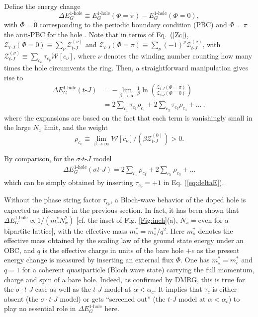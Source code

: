 \documentclass[aps,prb,twocolumn,notitlepage,superscriptaddress,showpacs]{revtex4-1}
\begin{document}
Define the energy change
\begin{equation}
\Delta E_{G}^{\text{1-hole}} \equiv E_{G}^{\text{1-hole}} (\Phi=\pi) - E_{G}^{\text{1-hole}} (\Phi=0),
\end{equation}
with $\Phi=0$ corresponding to the periodic boundary condition (PBC) and $\Phi=\pi$ the anit-PBC for the hole \cite{ZZ2013,ZZ2014qp}.  Note that  in terms of Eq.~(\ref{Zc}),
$\mathcal{Z}_{t\text{-}J}(\Phi=0) \equiv\sum_{\nu}\mathcal{Z}_{t\text{-}J}^{(\nu)}$ and $\mathcal{Z}_{t\text{-}J}(\Phi=\pi) \equiv\sum_{\nu}(-1)^{\nu}\mathcal{Z}_{t\text{-}J}^{(\nu)} $, with $\mathcal{Z}_{t\text{-}J}^{(\nu)}\equiv\sum_{c_{\nu}}{\tau }_{c_{\nu}}\mathcal{W}[c_{\nu}]$, where  $\nu$ denotes the winding number counting how many times the hole circumvents the ring.
Then, a straightforward manipulation gives rise to
\begin{align}
  \label{eq:deltaE}\nonumber
  \Delta E_{G}^{\text{1-hole}} (t\text{-}J) &= -\lim_{\beta\to\infty} \frac{1}{\beta} \ln \left( \frac{\mathcal{Z}_{t\text{-}J}(\Phi=\pi)}{\mathcal{Z}_{t\text{-}J}(\Phi=0)}  \right)\\
& =2 \sum_{c_1}  \tau_{c_1} \rho_{c_1}  + 2\sum_{c_3} \tau_{c_3} \rho_{c_3}+...  ~,
\end{align}
where the expansions are based on the fact that each term is vanishingly small \cite{Note3} in the large $N_x$ limit, and the weight
\begin{equation}
\rho_{c_{\nu}}\equiv \lim_{\beta\to\infty} \mathcal{W}[c_{\nu}]/(\beta \mathcal{Z}_{t\text{-}J}^{(0)})>0.
\end{equation}

By comparison, for the $\sigma$$\cdot$$t$-$J$ model
\begin{align}
  \label{eq:deltaEsigma}
 \Delta E_{G}^{\text{1-hole}} (\sigma t\text{-}J)  =2 \sum_{c_1}   \rho_{c_1}  + 2\sum_{c_3}  \rho_{c_3}+...
\end{align}
which can be simply obtained by inserting $\tau_{c_{\nu}}=+1$ in Eq. (\ref{eq:deltaE}).

Without the phase string factor $\tau_{c_{\nu}}$, a Bloch-wave behavior of the doped hole is expected as discussed in the previous section. In fact, it has been shown \cite{ZZ2013,ZZ2014qp} that $\Delta E_{G}^{\text{1-hole}} \propto1/(m^*_cN_x^2)$ [cf. the inset of Fig. \ref{Fig:inch}(a), $N_x=\mathrm{even}$ for a bipartite lattice], with the effective mass $m_c^*=m^*_s/q^2$. Here  $m^*_s$ denotes the effective mass obtained \cite{ZZ2013,ZZ2014qp} by the scaling law of the ground state energy under an OBC, and $q$ is the effective charge in units of the bare hole $+e$ as the present energy change is measured by inserting an external flux $\Phi$. One has $m^*_s=m^*_c$ and $q=1$ for a coherent quasiparticle (Bloch wave state) carrying the full momentum, charge and spin of a bare hole. Indeed, as confirmed \cite{ZZ2013,ZZ2014qp} by DMRG, this is true for the $\sigma\cdot$$ t$-$J$ case as well as the $t$-$J$ model at $\alpha<\alpha_c$.
It implies that ${\tau }_{c}$ is either absent (the $\sigma\cdot$$ t$-$J$ model) or gets ``screened out'' (the $t$-$J$ model at $\alpha<\alpha_c$) to play no essential role in $\Delta E_{G}^{\text{1-hole}}$ here.
\end{document}
